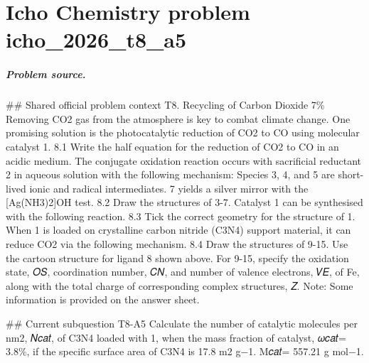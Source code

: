 
\chapter{Icho Chemistry problem icho\_2026\_t8\_a5}
\label{ch:IChO2026Problems_problem_icho_2026_t8_a5}

\paragraph{Problem source.}
\#\# Shared official problem context
T8. Recycling of Carbon Dioxide 7\% Removing CO2 gas from the atmosphere is key to combat climate change. One promising solution is the photocatalytic reduction of CO2 to CO using molecular catalyst 1. 8.1 Write the half equation for the reduction of CO2 to CO in an acidic medium. The conjugate oxidation reaction occurs with sacrificial reductant 2 in aqueous solution with the following mechanism: Species 3, 4, and 5 are short-lived ionic and radical intermediates. 7 yields a silver mirror with the [Ag(NH3)2]OH test. 8.2 Draw the structures of 3-7. Catalyst 1 can be synthesised with the following reaction. 8.3 Tick the correct geometry for the structure of 1. When 1 is loaded on crystalline carbon nitride (C3N4) support material, it can reduce CO2 via the following mechanism. 8.4 Draw the structures of 9-15. Use the cartoon structure for ligand 8 shown above. For 9-15, specify the oxidation state, 𝑂𝑆, coordination number, 𝐶𝑁, and number of valence electrons, 𝑉𝐸, of Fe, along with the total charge of corresponding complex structures, 𝑍. Note: Some information is provided on the answer sheet.

\#\# Current subquestion T8-A5
Calculate the number of catalytic molecules per nm2, 𝑁𝑐𝑎𝑡, of C3N4 loaded with 1, when the mass fraction of catalyst, 𝜔𝑐𝑎𝑡= 3.8\%, if the specific surface area of C3N4 is 17.8 m2 g−1. M𝑐𝑎𝑡= 557.21 g mol−1.

